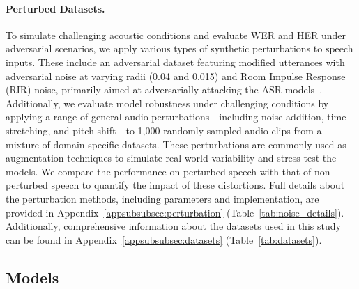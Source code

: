 \paragraph{Perturbed Datasets.} To simulate challenging acoustic conditions and evaluate WER and HER under adversarial scenarios, we apply various types of synthetic perturbations to speech inputs. These include an adversarial dataset featuring modified utterances with adversarial noise at varying radii (0.04 and 0.015) and Room Impulse Response (RIR) noise, primarily aimed at adversarially attacking the ASR models~\cite{Olivier2022RI}. Additionally, we evaluate model robustness under challenging conditions by applying a range of general audio perturbations—including noise addition, time stretching, and pitch shift—to 1,000 randomly sampled audio clips from a mixture of domain-specific datasets. These perturbations are commonly used as augmentation techniques to simulate real-world variability and stress-test the models. We compare the performance on perturbed speech with that of non-perturbed speech to quantify the impact of these distortions. Full details about the perturbation methods, including parameters and implementation, are provided in Appendix~\ref{appsubsubsec:perturbation} (Table~\ref{tab:noise_details}). Additionally, comprehensive information about the datasets used in this study can be found in Appendix~\ref{appsubsubsec:datasets} (Table~\ref{tab:datasets}).  

\subsection{Models}\label{subsec:models}



